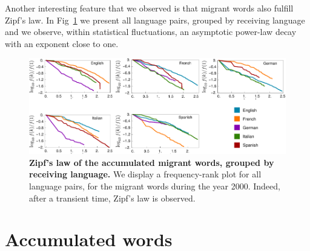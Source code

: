 \documentclass[10pt,letterpaper]{article} %
\begin{document}
Another interesting feature that we observed is that migrant words also 
fulfill Zipf's law. In Fig~\ref{fig.ZL_receiving} we present all language pairs, 
grouped by receiving language and we observe, 
within statistical fluctuations, an asymptotic power-law decay with an exponent
close to one. 


\begin{figure}[!h]
	\begin{adjustwidth}{-2cm}{1cm}
		\centering
		\includegraphics{images/zipfFinal.pdf}
		\caption{{\bf Zipf's law of the accumulated migrant words,
grouped by receiving language.} We display a frequency-rank 
plot for all language pairs, for the migrant words during the year 2000. Indeed, after a transient
time, Zipf's law is observed. }
		\label{fig.ZL_receiving}
	\end{adjustwidth}
\end{figure}

\section*{Accumulated words} %
\end{document}
